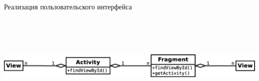 \documentclass[russian,utf8,a1paper,nostitching,simple]{eskdgraph}
\begin{document}
\begin{ESKDdrawing}
  \centering
  {\fontsize{50}{60}\selectfont Реализация пользовательского интерфейса}

  \vspace{2cm}
  \begin{minipage}{47cm}
    \centering
     \\
    \vspace{2cm}
    \centering
    \includegraphics[height=4cm]{fig/implementation_ui_hierarchy_wide.eps}


\end{minipage}
\end{ESKDdrawing}
\end{document}
